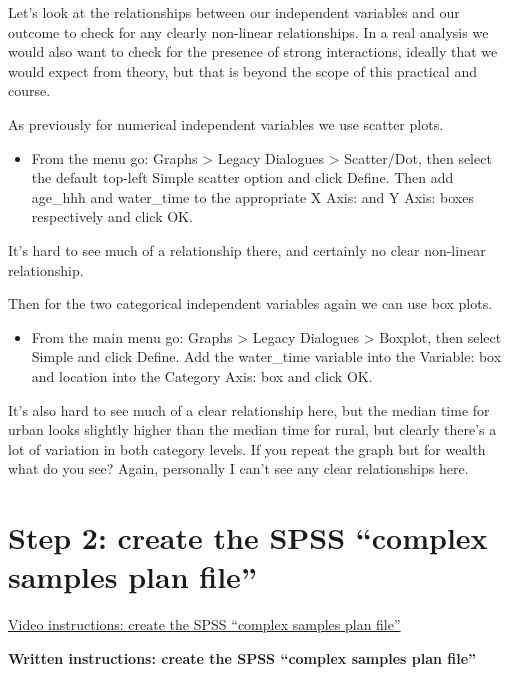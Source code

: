 \documentclass[
]{book}
\providecommand{\tightlist}{%
  \setlength{\itemsep}{0pt}\setlength{\parskip}{0pt}}
\begin{document}
Let's look at the relationships between our independent variables and our outcome to check for any clearly non-linear relationships. In a real analysis we would also want to check for the presence of strong interactions, ideally that we would expect from theory, but that is beyond the scope of this practical and course.

As previously for numerical independent variables we use scatter plots.

\begin{itemize}
\tightlist
\item
  From the menu go: Graphs \textgreater{} Legacy Dialogues \textgreater{} Scatter/Dot, then select the default top-left Simple scatter option and click Define. Then add age\_hhh and water\_time to the appropriate X Axis: and Y Axis: boxes respectively and click OK.
\end{itemize}

It's hard to see much of a relationship there, and certainly no clear non-linear relationship.

Then for the two categorical independent variables again we can use box plots.

\begin{itemize}
\tightlist
\item
  From the main menu go: Graphs \textgreater{} Legacy Dialogues \textgreater{} Boxplot, then select Simple and click Define. Add the water\_time variable into the Variable: box and location into the Category Axis: box and click OK.
\end{itemize}

It's also hard to see much of a clear relationship here, but the median time for urban looks slightly higher than the median time for rural, but clearly there's a lot of variation in both category levels. If you repeat the graph but for wealth what do you see? Again, personally I can't see any clear relationships here.

\hypertarget{step-2-create-the-spss-complex-samples-plan-file}{%
\section{Step 2: create the SPSS ``complex samples plan file''}\label{step-2-create-the-spss-complex-samples-plan-file}}

\href{https://youtu.be/UWYEU385pvM}{Video instructions: create the SPSS ``complex samples plan file''}

\textbf{Written instructions: create the SPSS ``complex samples plan file''}
\end{document}
